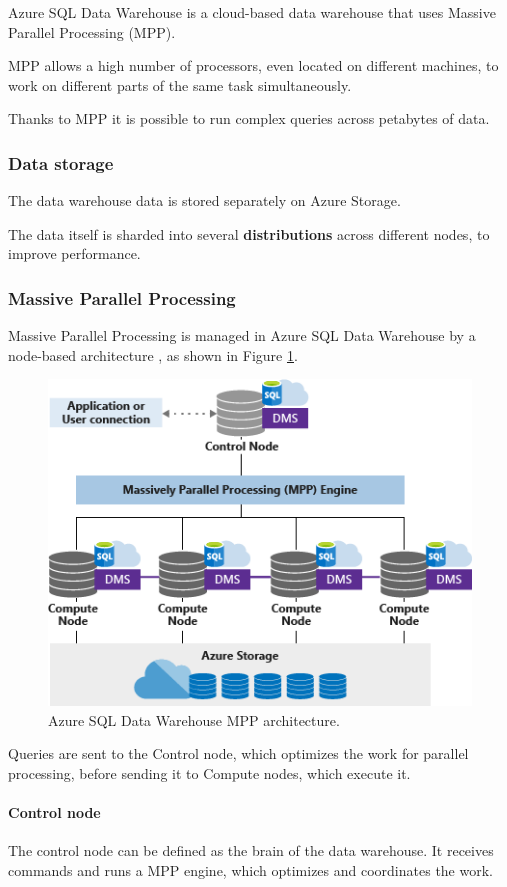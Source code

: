 Azure SQL Data Warehouse is a cloud-based data warehouse that uses Massive Parallel Processing (MPP).

MPP allows a high number of processors, even located on different machines, to work on different parts of the same task simultaneously.

Thanks to MPP it is possible to run complex queries across petabytes of data.

\subsubsection{Data storage}
    The data warehouse data is stored separately on Azure Storage.
    
    The data itself is sharded into several \textbf{distributions} across different nodes, to improve performance.

\subsubsection{Massive Parallel Processing}
    Massive Parallel Processing is managed in Azure SQL Data Warehouse by a node-based architecture \cite{bib:azure:dwh:mpp}, as shown in Figure \ref{fig:azure:dwh:mpp}.
    
    \begin{figure}
        \centering
        \includegraphics[width=.6\textwidth]{res/azure/dwh/mpp.png}
        \caption{Azure SQL Data Warehouse MPP architecture.}
        \label{fig:azure:dwh:mpp}
    \end{figure}
    
    Queries are sent to the Control node, which optimizes the work for parallel processing, before sending it to Compute nodes, which execute it.
    
    \paragraph{Control node}
        The control node can be defined as the brain of the data warehouse.
        It receives commands and runs a MPP engine, which optimizes and coordinates the work.
        
